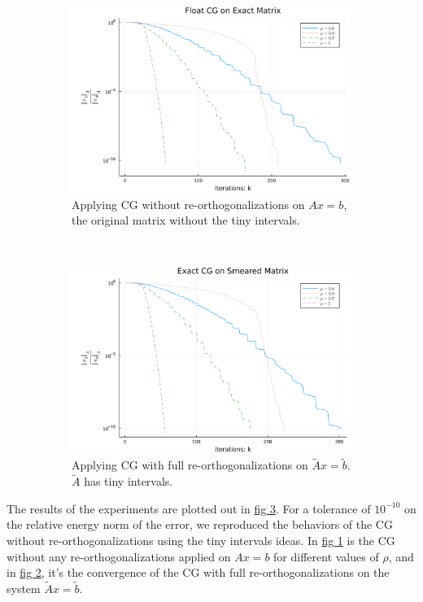 \documentclass[]{article}
\theoremstyle{definition}
\begin{document}
        \begin{figure}[H]
            \centering
            \begin{subfigure}[H]{12cm}
                \centering
                \includegraphics[width=12cm]{floats_cg_on_exact_matrix.png}
                \caption{Applying CG without re-orthogonalizations on $Ax = b$, the original matrix without the tiny intervals. }
                \label{fig:7.1}
            \end{subfigure}
            \\[2em]
            \begin{subfigure}[H]{12cm}
                \centering
                \includegraphics[width=12cm]{exact_cg_on_smeared_matrix.png}
                \caption{Applying CG with full re-orthogonalizations on $\tilde Ax = \tilde b$. $\tilde A$ has tiny intervals. }
                \label{fig:7.2}
            \end{subfigure}
            \caption{}\label{fig:7}
        \end{figure}
        The results of the experiments are plotted out in \hyperref[fig:7]{fig \ref*{fig:7}}. For a tolerance of $10^{-10}$ on the relative energy norm of the error, we reproduced the behaviors of the CG without re-orthogonalizations using the tiny intervals ideas. In \hyperref[fig:7.1]{fig \ref*{fig:7.1}} is the CG without any re-orthogonalizations applied on $Ax = b$ for different values of $\rho$, and in \hyperref[fig:7.2]{fig \ref*{fig:7.2}}, it's the convergence of the CG with full re-orthogonalizations on the system $\tilde A x = \tilde b$. 
        
\end{document}
